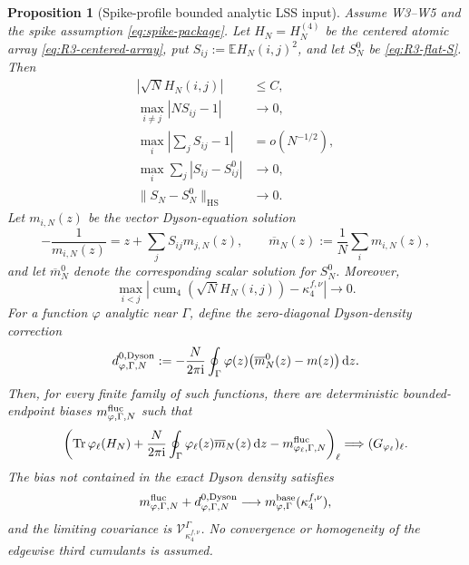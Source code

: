 \documentclass[11pt]{article}
\newtheorem{proposition}[theorem]{Proposition}
\theoremstyle{definition}
\theoremstyle{remark}
\newcommand{\E}{\mathbb E}
\newcommand{\cum}{\operatorname{cum}}
\newcommand{\Tr}{\operatorname{Tr}}
\newcommand{\ii}{\mathrm i}
\newcommand{\dd}{\mathrm d}
\newcommand{\HS}{\mathrm{HS}}
\newcommand{\norm}[1]{\lVert #1\rVert}
\begin{document}
\begin{proposition}[Spike-profile bounded analytic LSS input]
\label{prop:R3-external-input}
Assume W3--W5 and the spike assumption \eqref{eq:spike-package}.  Let
\(H_N=H_N^{(4)}\) be the centered atomic array
\eqref{eq:R3-centered-array}, put
\(S_{ij}:=\E H_N(i,j)^2\), and let \(S_N^0\) be
\eqref{eq:R3-flat-S}.  Then
\begin{align}
 |\sqrt N H_N(i,j)|&\le C,\label{eq:R3-external-bounded}\\
 \max_{i\ne j}|NS_{ij}-1|&\to0,\label{eq:R3-external-flat}\\
 \max_i\left|\sum_jS_{ij}-1\right|&=o(N^{-1/2}),
 \label{eq:R3-external-strong-row}\\
 \max_i\sum_j|S_{ij}-S_{ij}^0|&\to0,\label{eq:R3-external-row}\\
 \norm{S_N-S_N^0}_{\HS}&\to0.\label{eq:R3-external-HS}
\end{align}
Let \(m_{i,N}(z)\) be the vector Dyson-equation solution
\begin{equation}\label{eq:R3-QVE}
 -\frac1{m_{i,N}(z)}
 =z+\sum_jS_{ij}m_{j,N}(z),
 \qquad
 \overline m_N(z):=\frac1N\sum_i m_{i,N}(z),
\end{equation}
and let \(\overline m_N^0\) denote the corresponding scalar solution for
\(S_N^0\).  Moreover,
\begin{equation}\label{eq:R3-kappa-input}
 \max_{i<j}\left|
 \cum_4(\sqrt N H_N(i,j))-\kappa_4^{f,\nu}
 \right|\to0.
\end{equation}
For a function \(\varphi\) analytic near \(\Gamma\), define the
zero-diagonal Dyson-density correction
\begin{equation}\label{eq:R3-zero-Dyson-definition}
 d_{\varphi,\Gamma,N}^{0,\rm Dyson}
 :=-\frac{N}{2\pi\ii}\oint_\Gamma
 \varphi(z)\bigl(\overline m_N^0(z)-m(z)\bigr)\,\dd z.
\end{equation}
Then, for every finite family of such functions, there are deterministic
bounded-endpoint biases \(m_{\varphi,\Gamma,N}^{\rm fluc}\) such that
\begin{equation}\label{eq:R3-external-CLT}
 \left(
 \Tr\varphi_\ell(H_N)
 +\frac{N}{2\pi\ii}\oint_\Gamma
       \varphi_\ell(z)\overline m_N(z)\,\dd z
 -m_{\varphi_\ell,\Gamma,N}^{\rm fluc}
 \right)_\ell
 \Longrightarrow (G_{\varphi_\ell})_\ell .
\end{equation}
The bias not contained in the exact Dyson density satisfies
\begin{equation}\label{eq:R3-fluc-bias-limit}
 m_{\varphi,\Gamma,N}^{\rm fluc}
 +d_{\varphi,\Gamma,N}^{0,\rm Dyson}
 \longrightarrow m_{\varphi,\Gamma}^{\rm base}(\kappa_4^{f,\nu}),
\end{equation}
and the limiting covariance is
\(\mathcal V_{\kappa_4^{f,\nu}}^\Gamma\).  No convergence or homogeneity of
the edgewise third cumulants is assumed.
\end{proposition}
\end{document}
